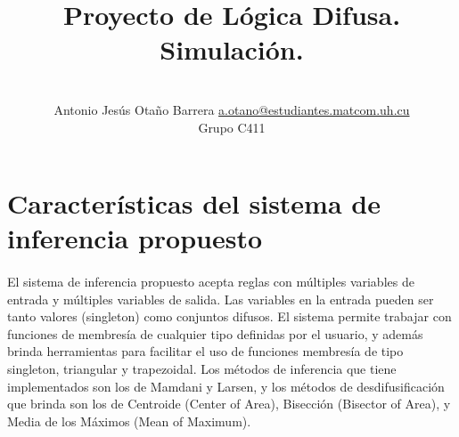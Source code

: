 \documentclass[a4paper,10pt]{article}
\title{Proyecto de Lógica Difusa. Simulación.}
\author{\\
\name Antonio Jesús Otaño Barrera \email \href{mailto:a.otano@estudiantes.matcom.uh.cu}{a.otano@estudiantes.matcom.uh.cu}
	\\ \addr Grupo C411}
\begin{document}

\maketitle







\section{Características del sistema de inferencia propuesto}\label{sec:1}

  \paragraph{} El sistema de inferencia propuesto acepta reglas con  múltiples variables de entrada y múltiples variables de salida. Las variables
  en la entrada pueden ser tanto valores (singleton) como conjuntos difusos. El sistema permite trabajar con funciones de membresía
  de cualquier tipo definidas por el usuario, y además brinda herramientas para facilitar el uso de funciones membresía de tipo singleton, triangular
  y trapezoidal. Los métodos de inferencia que tiene implementados son los de Mamdani y Larsen, y los métodos de desdifusificación que
  brinda son los de Centroide (Center of Area), Bisección (Bisector of Area), y Media de los Máximos (Mean of Maximum).
\end{document}
